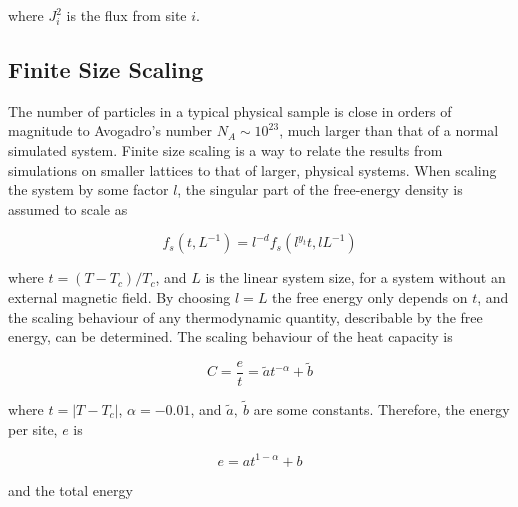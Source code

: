 \noindent where $J_i^2$ is the flux from site $i$.




\subsection{Finite Size Scaling}
\label{subsec:xyenergyScaling}

The number of particles in a typical physical sample is close in orders of magnitude to Avogadro's number $N_A \sim 10^{23}$, much larger than that of a normal simulated system. Finite size scaling is a way to relate the results from simulations on smaller lattices to that of larger, physical systems. When scaling the system by some factor $l$, the singular part of the free-energy density is assumed to scale as \cite{Plischke:EqStatMech}

\begin{equation}
    f_s(t, L^{-1}) = l^{-d} f_s( l^{y_t} t, l L^{-1})
\end{equation}

\noindent where $t = (T - T_c) / T_c$, and $L$ is the linear system size, for a system without an external magnetic field. By choosing $l = L$ the free energy only depends on $t$, and the scaling behaviour of any thermodynamic quantity, describable by the free energy, can be determined. The scaling behaviour of the heat capacity is \cite{Plischke:EqStatMech}

\begin{equation}
    C = \frac{e}{t} = \tilde a t^{-\alpha} + \tilde b
\end{equation}

\noindent where $t = |T - T_c|$, $\alpha = -0.01$, and $\tilde a, \ \tilde b$ are some constants. Therefore, the energy per site, $e$ is

\begin{equation}
    e = a t^{1 - \alpha} + b
\end{equation}

\noindent and the total energy

